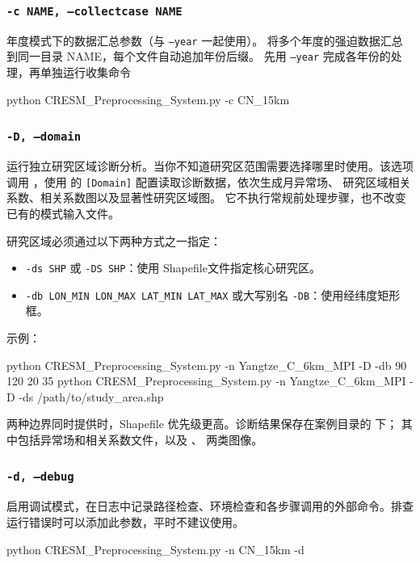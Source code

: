 \documentclass[UTF8,a4paper,11pt,fontset=none]{ctexart}
\begin{document}
\subsubsection{\texttt{-c\ NAME,\ --collectcase\ NAME}}

年度模式下的数据汇总参数（与 \texttt{--year} 一起使用）。
将多个年度的强迫数据汇总到同一目录 NAME，每个文件自动追加年份后缀。
先用 \texttt{--year} 完成各年份的处理，再单独运行收集命令
\begin{CPSCode} [leftmargin=2em,commandchars=\\\{\}]
    python CRESM_Preprocessing_System.py -c CN_15km 
\end{CPSCode}

\subsubsection{\texttt{-D,\ --domain}}

运行独立研究区域诊断分析。当你不知道研究区范围需要选择哪里时使用。该选项调用 ，使用  的 \texttt{[Domain]} 配置读取诊断数据，依次生成月异常场、 研究区域相关系数、相关系数图以及显著性研究区域图。
它不执行常规前处理步骤，也不改变已有的模式输入文件。

研究区域必须通过以下两种方式之一指定：

\begin{itemize}[leftmargin=4em]
    \item \texttt{-ds\ SHP} 或 \texttt{-DS\ SHP}：使用 Shapefile文件指定核心研究区。
    \item \texttt{-db\ LON\_MIN\ LON\_MAX\ LAT\_MIN\ LAT\_MAX} 或大写别名 \texttt{-DB}：使用经纬度矩形框。
\end{itemize}

示例：

\begin{CPSCode}[leftmargin=2em,commandchars=\\\{\}]
    python CRESM_Preprocessing_System.py -n Yangtze_C_6km_MPI -D -db 90 120 20 35
    python CRESM_Preprocessing_System.py -n Yangtze_C_6km_MPI -D -ds /path/to/study_area.shp
\end{CPSCode}

两种边界同时提供时，Shapefile 优先级更高。诊断结果保存在案例目录的  下；
其中包括异常场和相关系数文件，以及 、 两类图像。


\subsubsection{\texttt{-d,\ --debug}}
启用调试模式，在日志中记录路径检查、环境检查和各步骤调用的外部命令。排查运行错误时可以添加此参数，平时不建议使用。
\begin{CPSCode} [leftmargin=2em,commandchars=\\\{\}]
    python CRESM_Preprocessing_System.py -n CN_15km -d
\end{CPSCode}
\end{document}
